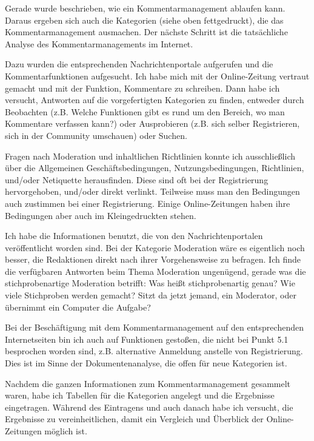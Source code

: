\begin{itemize}
    Gerade wurde beschrieben, wie ein Kommentarmanagement ablaufen
    kann. Daraus ergeben sich auch die Kategorien (siehe oben fettgedruckt),
    die das Kommentarmanagement ausmachen.
   Der nächste Schritt ist die tatsächliche Analyse des Kommentarmanagements im 
   Internet. 
    
    Dazu wurden die entsprechenden Nachrichtenportale aufgerufen und die
    Kommentarfunktionen aufgesucht. Ich habe mich mit der Online-Zeitung vertraut
    gemacht und mit der Funktion, Kommentare zu schreiben. 
    Dann habe ich versucht, Antworten auf die vorgefertigten Kategorien zu finden,
    entweder durch Beobachten (z.B. Welche Funktionen gibt es rund um den Bereich,
    wo man Kommentare verfassen kann?) oder Ausprobieren (z.B. sich selber
    Registrieren, sich in der Community umschauen) oder Suchen.
    
    Fragen nach Moderation und inhaltlichen Richtlinien konnte ich ausschließlich 
    über die Allgemeinen Geschäftsbedingungen, Nutzungsbedingungen, Richtlinien,
    und/oder Netiquette herausfinden. Diese sind oft bei der Registrierung hervorgehoben,
    und/oder direkt verlinkt. Teilweise muss man den Bedingungen auch zustimmen bei einer
    Registrierung. Einige Online-Zeitungen haben ihre Bedingungen aber auch im 
    \glqq Kleingedruckten\grqq\- stehen.
    
    Ich habe die Informationen benutzt, die von den Nachrichtenportalen veröffentlicht
    worden sind. Bei der Kategorie \glqq Moderation\grqq\- wäre es eigentlich noch besser, 
    die Redaktionen direkt nach ihrer Vorgehensweise zu befragen. Ich finde die 
    verfügbaren Antworten beim Thema Moderation ungenügend,
    gerade was die \glqq stichprobenartige\grqq\- Moderation betrifft: Was heißt stichprobenartig genau?
    Wie viele Stichproben werden gemacht? Sitzt da jetzt jemand, ein Moderator, oder übernimmt  
    ein Computer die Aufgabe?
    
    Bei der Beschäftigung mit dem Kommentarmanagement auf den entsprechenden Internetseiten
    bin ich auch auf Funktionen gestoßen, die nicht bei Punkt 5.1
    besprochen worden sind, z.B.  \glqq alternative Anmeldung\grqq\- anstelle von Registrierung.
    Dies ist im Sinne der Dokumentenanalyse, die offen für neue Kategorien ist.
    
    Nachdem die ganzen Informationen zum Kommentarmanagement gesammelt waren, 
    habe ich Tabellen für die Kategorien angelegt und die Ergebnisse eingetragen.
    Während des Eintragens und auch danach habe ich versucht, die Ergebnisse zu 
    vereinheitlichen, damit ein Vergleich und Überblick der Online-Zeitungen möglich ist. 
    

\end{itemize}
